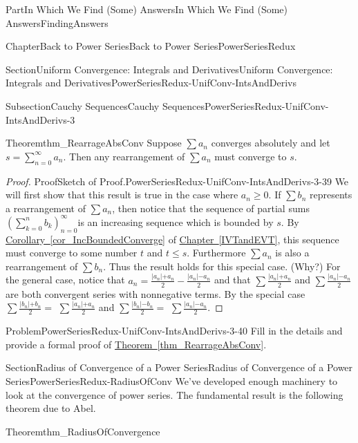 \documentclass[oneside,10pt,]{book}
\newcommand{\xreffont}{\relax}
\numberwithin{equation}{part}
\begin{document}
\begin{partptx}{Part}{In Which We Find (Some) Answers}{}{In Which We Find (Some) Answers}{}{}{FindingAnswers}
\begin{chapterptx}{Chapter}{Back to Power Series}{}{Back to Power Series}{}{}{PowerSeriesRedux}
\begin{sectionptx}{Section}{Uniform Convergence: Integrals and Derivatives}{}{Uniform Convergence: Integrals and Derivatives}{}{}{PowerSeriesRedux-UnifConv-IntsAndDerivs}
\begin{subsectionptx}{Subsection}{Cauchy Sequences}{}{Cauchy Sequences}{}{}{PowerSeriesRedux-UnifConv-IntsAndDerivs-3}
\begin{theorem}{Theorem}{}{}{thm_RearrageAbsConv}%
 Suppose \(\sum a_n\) converges absolutely and let \(s=\sum_{n=0}^\infty a_n\).  Then any rearrangement of \(\sum a_n\) must converge to \(s\).%
\end{theorem}
\begin{proof}{Proof}{Sketch of Proof.}{PowerSeriesRedux-UnifConv-IntsAndDerivs-3-39}
We will first show that this result is true in the case where \(a_n\geq 0\).  If \(\sum b_n\) represents a rearrangement of \(\sum a_n\), then notice that the sequence of partial sums \(\left(\sum_{k=0}^nb_k\right)_{n=0}^\infty\)is an increasing sequence which is bounded by \(s\).  By \hyperref[cor_IncBoundedConverge]{Corollary~{\xreffont\ref{cor_IncBoundedConverge}}} of \hyperref[IVTandEVT]{Chapter~{\xreffont\ref{IVTandEVT}}}, this sequence must converge to some number \(t\) and \(t\leq s\).  Furthermore \(\sum a_n\) is also a rearrangement of \(\sum b_n\). Thus the result holds for this special case. (Why?) For the general case, notice that \(a_n=\frac{|a_n\mathopen|+a_n}{2}-\frac{|a_n\mathopen|-a_n}{2}\) and that \(\sum\frac{|a_n\mathopen|+a_n}{2}\) and \(\sum\frac{|a_n\mathopen|-a_n}{2}\) are both convergent series with nonnegative terms.  By the special case \(\sum\frac{|b_n\mathopen|+b_n}{2}=\) \(\sum\frac{|a_n\mathopen|+a_n}{2}\) and \(\sum\frac{|b_n\mathopen|-b_n}{2}=\) \(\sum\frac{|a_n\mathopen|-a_n}{2}\).%
\end{proof}
\begin{problem}{Problem}{}{PowerSeriesRedux-UnifConv-IntsAndDerivs-3-40}%
 Fill in the details and provide a formal proof of \hyperref[thm_RearrageAbsConv]{Theorem~{\xreffont\ref{thm_RearrageAbsConv}}}.%
\end{problem}
\end{subsectionptx}
\end{sectionptx}
%
%
\typeout{************************************************}
\typeout{************************************************}
%
\begin{sectionptx}{Section}{Radius of Convergence of a Power Series}{}{Radius of Convergence of a Power Series}{}{}{PowerSeriesRedux-RadiusOfConv}
We've developed enough machinery to look at the convergence of power series.  The fundamental result is the following theorem due to Abel.%
\begin{theorem}{Theorem}{}{}{thm_RadiusOfConvergence}%

\end{theorem}
\end{sectionptx}
\end{chapterptx}
\end{partptx}
\end{document}

